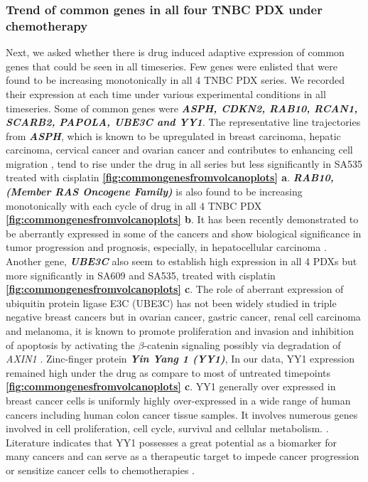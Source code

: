 \subsubsection{Trend of common genes in all four TNBC PDX under chemotherapy}
Next, we asked whether there is drug induced adaptive expression of common genes that could be seen in all timeseries. 
 Few genes were enlisted that were found to be increasing monotonically in all 4 TNBC PDX series. We recorded their expression at each time under various experimental conditions in all timeseries. Some of common genes were  \textit{\textbf{ASPH, CDKN2, RAB10, RCAN1, SCARB2, PAPOLA, UBE3C and YY1}}. The representative line trajectories from \textit{\textbf{ASPH}}, which is known to be upregulated in breast carcinoma, hepatic carcinoma, cervical cancer and ovarian cancer and contributes to enhancing cell migration  \cite{zheng2020diverse,li2018expression, hou2018recent, lin2019asph}, tend to rise under the drug in all series but less significantly in SA535 treated with cisplatin \textbf{\autoref{fig:commongenesfromvolcanoplots} a}. 
 \textit{\textbf{RAB10, (Member RAS Oncogene Family)}} is also found to be increasing monotonically with each cycle of drug in all 4 TNBC PDX \textbf{\autoref{fig:commongenesfromvolcanoplots} b}. It has been recently demonstrated to be aberrantly expressed in some of the cancers and show biological significance in tumor progression and prognosis,  especially, in hepatocellular carcinoma \cite{wang2017rab10, he2002identification, jiang2016mir}. 
Another gene,  \textit{\textbf{UBE3C}} also seem to establish high expression in all 4 PDXs but more significantly in SA609 and SA535, treated with cisplatin \textbf{\autoref{fig:commongenesfromvolcanoplots} c}. The role of aberrant expression of ubiquitin protein ligase E3C (UBE3C) has not been widely studied in triple negative breast cancers but in ovarian cancer, gastric cancer, renal cell carcinoma and melanoma, it is known to promote proliferation and invasion and inhibition of apoptosis by activating the $\beta$-catenin signaling possibly via degradation of  \textit{AXIN1} \cite{xiong2019mir, pan2015ubiquitin, zhang2020ube3c}.
  Zinc-finger protein  \textit{\textbf{Yin Yang 1 (YY1)}}, In our data, YY1 expression remained high under the drug as compare to most of untreated timepoints \textbf{\autoref{fig:commongenesfromvolcanoplots} c}. YY1 generally over expressed in breast cancer cells 
is uniformly highly over-expressed in a wide range of human cancers including human colon cancer tissue samples. It involves numerous genes involved in cell proliferation, cell cycle, survival and cellular metabolism.  \cite{wan2012yin, chinnappan2009transcription, meliala2020biological}. Literature indicates that YY1 possesses a great potential as a biomarker for many cancers and can serve as a therapeutic target to impede cancer progression or sensitize cancer cells to chemotherapies \cite{wan2012yin, chinnappan2009transcription, meliala2020biological, shi2015role}.

